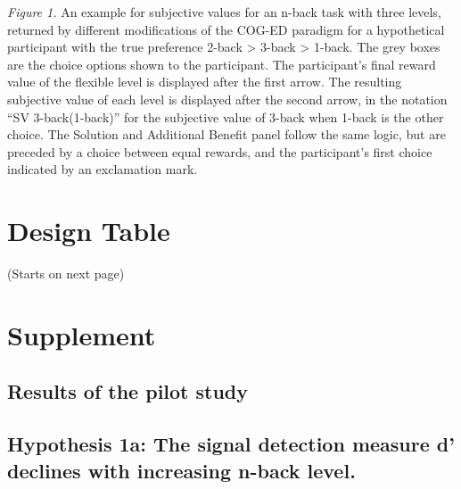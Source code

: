 \documentclass[
  man,floatsintext]{apa6}
\begin{document}
\emph{Figure 1.} An example for subjective values for an n-back task with three levels, returned by different modifications of the COG-ED paradigm for a hypothetical participant with the true preference 2-back \textgreater{} 3-back \textgreater{} 1-back. The grey boxes are the choice options shown to the participant. The participant's final reward value of the flexible level is displayed after the first arrow. The resulting subjective value of each level is displayed after the second arrow, in the notation ``SV 3-back(1-back)'' for the subjective value of 3-back when 1-back is the other choice. The Solution and Additional Benefit panel follow the same logic, but are preceded by a choice between equal rewards, and the participant's first choice indicated by an exclamation mark.

\newpage

\hypertarget{DesignTableSection}{%
\section{Design Table}\label{DesignTableSection}}

(Starts on next page)



\newpage

\hypertarget{supplement}{%
\section{Supplement}\label{supplement}}

\setcounter{section}{19}
\setcounter{figure}{0}
\setcounter{table}{0}

\hypertarget{results-of-the-pilot-study}{%
\subsection{Results of the pilot study}\label{results-of-the-pilot-study}}

\hypertarget{hypothesis-1a-the-signal-detection-measure-d-declines-with-increasing-n-back-level.}{%
\subsection{Hypothesis 1a: The signal detection measure d' declines with increasing n-back level.}\label{hypothesis-1a-the-signal-detection-measure-d-declines-with-increasing-n-back-level.}}
\end{document}
